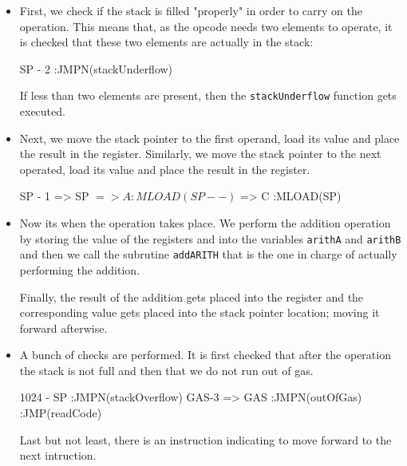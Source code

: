\begin{itemize}
    
    \item First, we check if the stack is filled "properly" in order to carry on the \ADD operation. This means that, as the \ADD opcode needs two elements to operate, it is checked that these two elements are actually in the stack:
    
    \begin{zkasm}
        SP - 2          :JMPN(stackUnderflow)
    \end{zkasm}
    
    If less than two elements are present, then the \texttt{stackUnderflow} function gets executed.
    
    \item Next, we move the stack pointer to the first operand, load its value and place the result in the \A register. Similarly, we move the stack pointer to the next operated, load its value and place the result in the \C register.
    
    \begin{zkasm}
        SP - 1 => SP
        $ => A          :MLOAD(SP--)
        $ => C          :MLOAD(SP)
    \end{zkasm}
    
    \item Now its when the operation takes place. We perform the addition operation by storing the value of the registers \A and \C into the variables \texttt{arithA} and \texttt{arithB} and then we call the subrutine \texttt{addARITH} that is the one in charge of actually performing the addition.
    
    
    Finally, the result of the addition gets placed into the register \E and the corresponding value gets placed into the stack pointer location; moving it forward afterwise.
    
    
    \item A bunch of checks are performed. It is first checked that after the operation the stack is not full and then that we do not run out of gas.
    
    \begin{zkasm}
        1024 - SP       :JMPN(stackOverflow)
        GAS-3 => GAS    :JMPN(outOfGas)
        :JMP(readCode)
    \end{zkasm}
    
    Last but not least, there is an instruction indicating to move forward to the next intruction.
    
\end{itemize}

